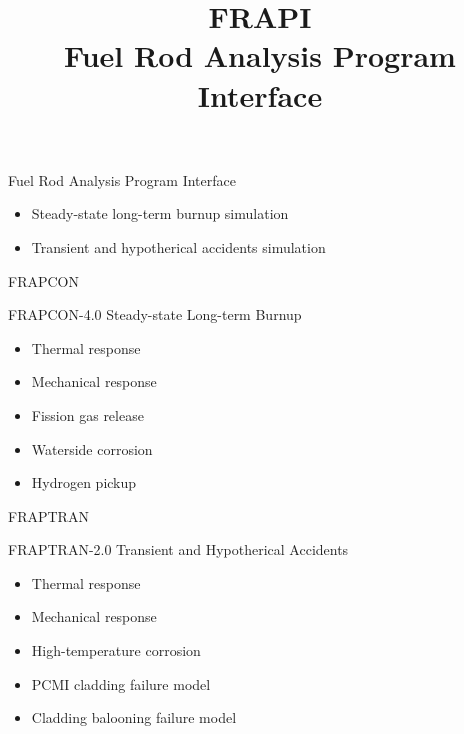 \documentclass[11pt]{beamer}
\title{FRAPI \\ Fuel Rod Analysis Program Interface}
\institute{UNIST Core}
\begin{document}
\titlepage

\begin{frame}{Fuel Rod Analysis Program Interface}
 \begin{center}
  \end{center}
  
  \begin{itemize}
    \item Steady-state long-term burnup simulation
    \item Transient and hypotherical accidents simulation
  \end{itemize}
  
\end{frame}


\begin{frame}{FRAPCON}
\scriptsize

  \begin{block}{FRAPCON-4.0}
   Steady-state Long-term Burnup
   \begin{itemize}
   \item Thermal response
   \item Mechanical response
   \item Fission gas release
   \item Waterside corrosion
   \item Hydrogen pickup
   \end{itemize}
  \end{block}

\end{frame}

\begin{frame}{FRAPTRAN}
\scriptsize

  \begin{block}{FRAPTRAN-2.0}
   Transient and Hypotherical Accidents
   \begin{itemize}
   \item Thermal response
   \item Mechanical response
   \item High-temperature corrosion
   \item PCMI cladding failure model
   \item Cladding balooning failure model
   \end{itemize}
  \end{block}

\end{frame}
\end{document}
